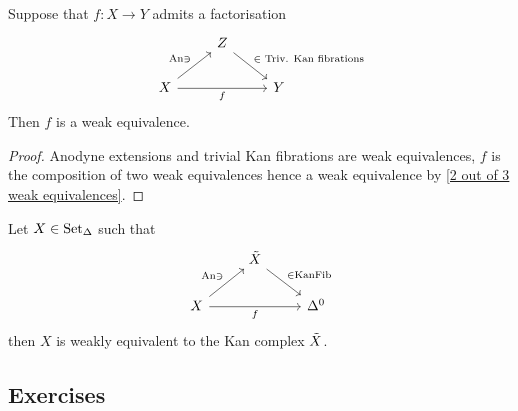 \begin{cor}
    Suppose that $f \colon X \to Y$ admits a factorisation 
    \[
    \begin{tikzcd}
        &
        Z
        \ar[rd, "\in \text{ Triv. Kan fibrations}"]
        &
        \\
        X
        \ar[ru, "\An \ni"]
        \ar[rr, "f"']
        &&
        Y
    \end{tikzcd}
    \]
    Then $f$ is a weak equivalence.
\end{cor}

\begin{proof}
    Anodyne extensions and trivial Kan fibrations are weak equivalences, $f$ is the composition of two weak equivalences hence a weak equivalence by \cref{2 out of 3 weak equivalences}.
\end{proof}

Let $X \in \operatorname{Set}_{\Delta}$ such that
\[
    \begin{tikzcd}
        &
        \Tilde{X}
        \ar[rd, "\in \KanFib"]
        &
        \\
        X
        \ar[ru, "\An \ni"]
        \ar[rr, "f"']
        &&
        \Delta^0
    \end{tikzcd}
\]
then $X$ is weakly equivalent to the Kan complex $\Tilde{X}$.


\subsection{Exercises}

